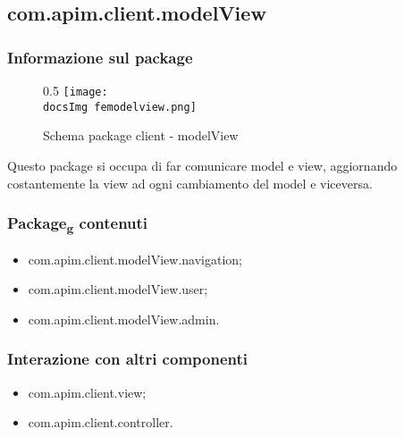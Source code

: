 {	\subsection{com.apim.client.modelView}{
		\subsubsection{Informazione sul package}{
			\begin{figure}[H]{0.5}
				\centering
				\texttt{[image: \\docsImg femodelview.png]}
				\caption{Schema package client - modelView}
			\end{figure}
			Questo package si occupa di far comunicare model e view, aggiornando costantemente la view ad ogni cambiamento del model e viceversa.
		}
		\subsubsection{Package\textsubscript{g} contenuti}{
			\begin{itemize}
				\item com.apim.client.modelView.navigation;
				\item com.apim.client.modelView.user;
				\item com.apim.client.modelView.admin.
			\end{itemize}
		}
		\subsubsection{Interazione con altri componenti}{
			\begin{itemize}
				\item com.apim.client.view;
				\item com.apim.client.controller.
			\end{itemize}
}}}
